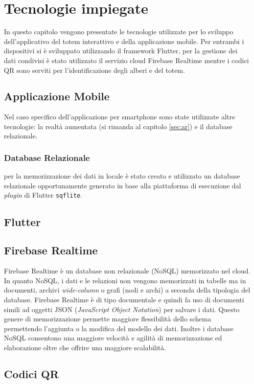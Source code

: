 \section{Tecnologie impiegate}
In questo capitolo vengono presentate le tecnologie utilizzate per lo sviluppo dell'applicativo del totem interattivo e della applicazione mobile. Per entrambi i dispositivi si è sviluppato utilizzando il framework Flutter, per la gestione dei dati condivisi è stato utilizzato il servizio cloud Firebase Realtime mentre i codici QR sono serviti per l'identificazione degli alberi e del totem.

\subsection{Applicazione Mobile}
Nel caso specifico dell'applicazione per smartphone sono state utilizzate altre tecnologie: la realtà aumentata (si rimanda al capitolo \ref{sec:ar}) e il database relazionale.
\subsubsection{Database Relazionale}
per la memorizzazione dei dati in locale è stato creato e utilizzato un database relazionale opportunamente generato in base alla piattaforma di esecuzione dal \textit{plugin} di Flutter \texttt{sqflite}.
\subsection{Flutter}

%
\subsection{Firebase Realtime}
Firebase Realtime è un database non relazionale (NoSQL) memorizzato nel cloud. In quanto NoSQL, i dati e le relazioni non vengono memorizzati in tabelle ma in documenti, archivi \textit{wide-column} o grafi (nodi e archi) a seconda della tipologia del database.
Firebase Realtime è di tipo documentale e quindi fa uso di documenti simili ad oggetti JSON (\textit{JavaScript Object Notation}) per salvare i dati. Questo genere di memorizzazione permette maggiore flessibilità dello schema permettendo l'aggiunta o la modifica del modello dei dati. Inoltre i database NoSQL consentono una maggiore velocità e agilità di memorizzazione ed elaborazione oltre che offrire una maggiore scalabilità.

%
\subsection{Codici QR}

